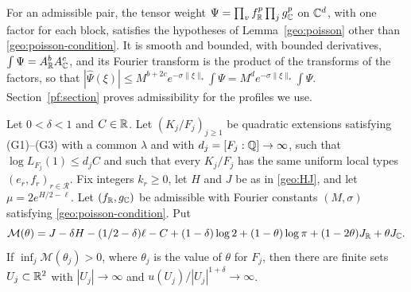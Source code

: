 For an admissible pair, the tensor weight
$\Psi=\prod_vf_\mathbb R^p\prod_jg_\mathbb C^p$ on $\mathbb C^d$, with one factor for each
block, satisfies the hypotheses of Lemma~\ref{geo:poisson} other than
\eqref{geo:poisson-condition}. It is smooth and bounded, with bounded
derivatives, $\int\Psi=A_\mathbb R^bA_\mathbb C^c$, and its Fourier transform is the
product of the transforms of the factors, so that
$|\widehat\Psi(\xi)|\le M^{b+2c}e^{-\sigma\|\xi\|_*}\int\Psi
=M^de^{-\sigma\|\xi\|_*}\int\Psi$. Section~\ref{pf:section} proves
admissibility for the profiles we use.

\begin{proposition}\label{geo:transfer}
Let $0<\delta<1$ and $C\in\mathbb R$. Let $(K_j/F_j)_{j\ge1}$ be quadratic
extensions satisfying (G1)--(G3) with a common $\lambda$ and with
$d_j=[F_j:\mathbb Q]\to\infty$, such that $\log L_{F_j}(1)\le d_jC$ and such
that every $K_j/F_j$ has the same uniform local types
$(e_r,f_r)_{r\in\mathcal R}$. Fix integers $k_r\ge0$, let $H$ and $J$ be
as in \eqref{geo:HJ}, and let $\mu=2e^{H/2-\ell}$. Let $(f_\mathbb R,g_\mathbb C)$ be
admissible with Fourier constants $(M,\sigma)$ satisfying
\eqref{geo:poisson-condition}. Put
\begin{equation}\label{geo:general-margin}
 \mathcal M(\theta)=J-\delta H-(1/2-\delta)\ell-C
 +(1-\delta)\log2+(1-\theta)\log\pi
 +(1-2\theta)J_\mathbb R+\theta J_\mathbb C.
\end{equation}
If $\inf_j\mathcal M(\theta_j)>0$, where $\theta_j$ is the value of
$\theta$ for $F_j$, then there are finite sets $U_j\subset\mathbb R^2$ with
$|U_j|\to\infty$ and $u(U_j)/|U_j|^{1+\delta}\to\infty$.
\end{proposition}

